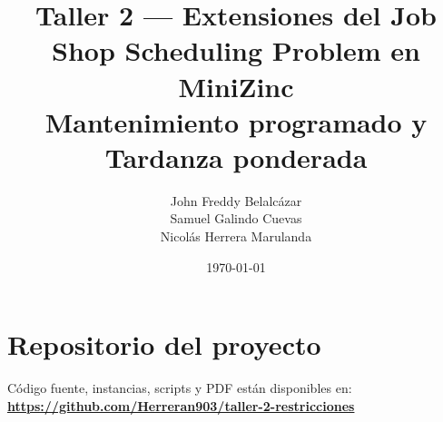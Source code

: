 \documentclass[11pt,a4paper]{article}
\title{Taller 2 — Extensiones del Job Shop Scheduling Problem en MiniZinc\\
\large Mantenimiento programado y Tardanza ponderada}
\author{John Freddy Belalcázar \\ Samuel Galindo Cuevas \\ Nicolás Herrera Marulanda}
\date{\today}
\begin{document}
\maketitle
\tableofcontents

\section*{Repositorio del proyecto}
Código fuente, instancias, scripts y PDF están disponibles en:\\
\noindent\textbf{\url{https://github.com/Herreran903/taller-2-restricciones}}












\end{document}
